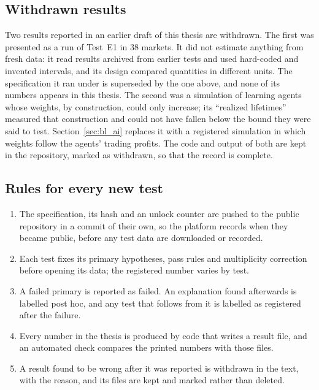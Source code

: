 \subsection{Withdrawn results}\label{sec:ev_withdrawn}

Two results reported in an earlier draft of this thesis are withdrawn. The first was presented as a run of Test~E1 in 38 markets. It did not estimate anything from fresh data: it read results archived from earlier tests and used hard-coded and invented intervals, and its design compared quantities in different units. The specification it ran under is superseded by the one above, and none of its numbers appears in this thesis. The second was a simulation of learning agents whose weights, by construction, could only increase; its ``realized lifetimes'' measured that construction and could not have fallen below the bound they were said to test. Section~\ref{sec:bl_ai} replaces it with a registered simulation in which weights follow the agents' trading profits. The code and output of both are kept in the repository, marked as withdrawn, so that the record is complete.

\subsection{Rules for every new test}\label{sec:ev_rules}

\begin{enumerate}
\item The specification, its hash and an unlock counter are pushed to the public repository in a commit of their own, so the platform records when they became public, before any test data are downloaded or recorded.
\item Each test fixes its primary hypotheses, pass rules and multiplicity correction before opening its data; the registered number varies by test.
\item A failed primary is reported as failed. An explanation found afterwards is labelled post hoc, and any test that follows from it is labelled as registered after the failure.
\item Every number in the thesis is produced by code that writes a result file, and an automated check compares the printed numbers with those files.
\item A result found to be wrong after it was reported is withdrawn in the text, with the reason, and its files are kept and marked rather than deleted.
\end{enumerate}

